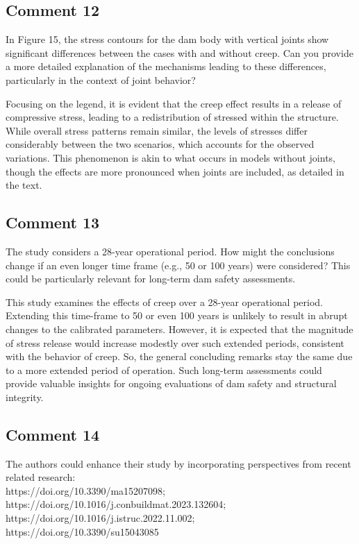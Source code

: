 \documentclass{ar2rc}
\begin{document}
	\subsection{Comment 12}
	\RC	In Figure 15, the stress contours for the dam body with vertical joints show significant differences between the cases with and without creep. Can you provide a more detailed explanation of the mechanisms leading to these differences, particularly in the context of joint behavior?
	
	\AR Focusing on the legend, it is evident that the creep effect results in a release of compressive stress, leading to a redistribution of stressed within the structure. While overall stress patterns remain similar, the levels of stresses differ considerably between the two scenarios, which accounts for the observed variations. This phenomenon is akin to what occurs in models without joints, though the effects are more pronounced when joints are included, as detailed in the text.
	
	
	\subsection{Comment 13}
	\RC The study considers a 28-year operational period. How might the conclusions change if an even longer time frame (e.g., 50 or 100 years) were considered? This could be particularly relevant for long-term dam safety assessments.
	
	\AR This study examines the effects of creep over a 28-year operational period. Extending this time-frame to 50 or even 100 years is unlikely to result in abrupt changes to the calibrated parameters. However, it is expected that the magnitude of stress release would increase modestly over such extended periods, consistent with the behavior of creep. So, the general concluding remarks stay the same due to a more extended period of operation. Such long-term assessments could provide valuable insights for ongoing evaluations of dam safety and structural integrity.
	
	
	\subsection{Comment 14}
	\RC The authors could enhance their study by incorporating perspectives from recent related research:\\
	https://doi.org/10.3390/ma15207098;\\ https://doi.org/10.1016/j.conbuildmat.2023.132604;\\
	https://doi.org/10.1016/j.istruc.2022.11.002;\\ https://doi.org/10.3390/su15043085
	
\end{document}

